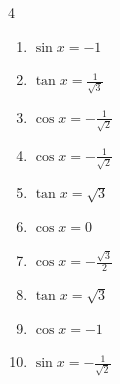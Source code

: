 


\setcounter{quesnum}{52}

\begin{multicols}{4}
\begin{enumerate}
  \itemsep=2pt
  \item $\displaystyle \sin{x}  = -1$


  \item $\displaystyle \tan{x}  = \frac{1}{\sqrt{3}}$


  \item $\displaystyle \cos{x}  = -\frac{1}{\sqrt{2}}$


  \item $\displaystyle \cos{x}  = -\frac{1}{\sqrt{2}}$


  \item $\displaystyle \tan{x}  = \sqrt{3}$


  \item $\displaystyle \cos{x}  = 0$


  \item $\displaystyle \cos{x}  = -\frac{\sqrt{3}}{2}$


  \item $\displaystyle \tan{x}  = \sqrt{3}$


  \item $\displaystyle \cos{x}  = -1$

        \phantom{$\displaystyle x = \pi$}

  \item $\displaystyle \sin{x}  = -\frac{1}{\sqrt{2}}$



\end{enumerate}
\end{multicols}
